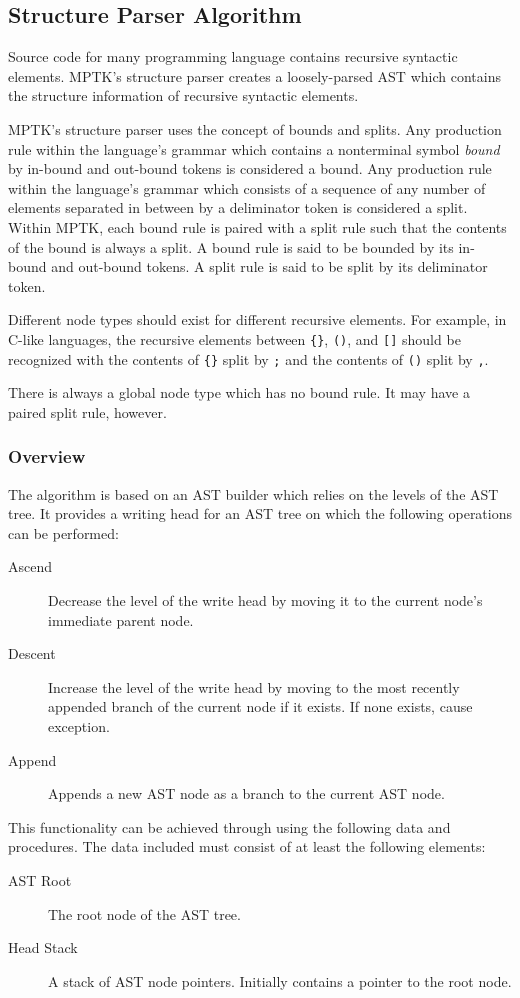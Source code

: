 \documentclass[10pt,a4paper]{article}
\begin{document}
\subsection{Structure Parser Algorithm}
Source code for many programming language contains recursive syntactic elements. MPTK's structure parser creates a loosely-parsed AST which contains the structure information of recursive syntactic elements.

MPTK's structure parser uses the concept of bounds and splits. Any production rule within the language's grammar which contains a nonterminal symbol \textit{bound} by in-bound and out-bound tokens is considered a bound. Any production rule within the language's grammar which consists of a sequence of any number of elements separated in between by a deliminator token is considered a split. Within MPTK, each bound rule is paired with a split rule such that the contents of the bound is always a split. A bound rule is said to be bounded by its in-bound and out-bound tokens. A split rule is said to be split by its deliminator token.

Different node types should exist for different recursive elements. For example, in C-like languages, the recursive elements between \verb|{}|, \verb|()|, and \verb|[]| should be recognized with the contents of \verb|{}| split by \verb|;| and the contents of \verb|()| split by \verb|,|. 

There is always a global node type which has no bound rule. It may have a paired split rule, however.

\subsubsection{Overview}
The algorithm is based on an AST builder which relies on the levels of the AST tree. It provides a writing head for an AST tree on which the following operations can be performed:
\begin{description}
\item[Ascend] Decrease the level of the write head by moving it to the current node's immediate parent node.
\item[Descent] Increase the level of the write head by moving to the most recently appended branch of the current node if it exists. If none exists, cause exception.
\item[Append] Appends a new AST node as a branch to the current AST node.
\end{description}

This functionality can be achieved through using the following data and procedures. The data included must consist of at least the following elements:
\begin{description}
\item[AST Root] The root node of the AST tree.
\item[Head Stack] A stack of AST node pointers. Initially contains a pointer to the root node.
\end{description}
\end{document}
